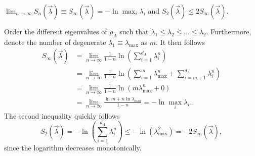 \documentclass[../../main.tex]{subfiles}
\begin{document}
\begin{claim}
      $\lim_{n \to \infty} S_n (\vec \lambda) \equiv S_\infty (\vec \lambda)= - \ln \max_i \lambda_i$ and $S_2(\vec \lambda) \leq 2 S_\infty(\vec \lambda)$.
\end{claim}
\begin{claimproof}
      Order the different eigenvalues of $\rho_A$ such that $\lambda_1 \leq \lambda_2 \leq \ldots \leq \lambda_2$. Furthermore, denote the number of degenerate $\lambda_1\equiv\lambda_{\text{max}}$ as $m$. It then follows      
      \begin{align*}
            S_\infty (\vec \lambda) &= \lim_{n \to \infty} \frac{1}{1-n} \ln \left( \sum_{i=1}^{d_A} \lambda_i^n \right) \\
            &= \lim_{n \to \infty} \frac{1}{1-n} 
            \ln \left(  
            \sum_{i=1}^{m} \lambda_\text{max} ^n + \sum_{i=m+1}^{d_A}  \lambda_i^n
            \right) \\
            &= \lim_{n \to \infty} \frac{1}{1-n} 
            \ln \left(  m \lambda_\text{max}^n + 0 \right) \\
            &= \lim_{n \to \infty} \frac{\ln m + n \ln \lambda_\text{max}}{1-n} = - \ln \max_{i} \lambda_i .
      \end{align*}
      The second inequality quickly follows
      \begin{equation*}
            S_2 (\vec \lambda) = - \ln(\sum_{i=1}^{d_A} \lambda_i^n) \leq - \ln (\lambda_\text{max}^2) = -2 S_\infty (\vec \lambda),
      \end{equation*}
      since the logarithm decreases monotonically.
\end{claimproof}
\end{document}
